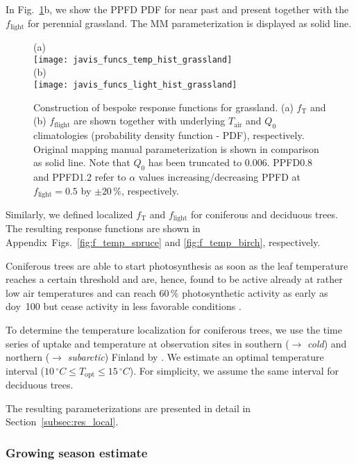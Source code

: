 \documentclass[bg, manuscript]{copernicus}
\begin{document}
In Fig.~\ref{fig:f_temp_grassland}b, we show the PPFD PDF for near past and present together with the $f_\mathrm{light}$ for perennial grassland. The MM parameterization is displayed as solid line.

\begin{figure}[t]
  \centering
  (a)\\
  \texttt{[image: javis\_funcs\_temp\_hist\_grassland]}\\
  (b)\\
  \texttt{[image: javis\_funcs\_light\_hist\_grassland]}
\caption{Construction of bespoke response functions for grassland. (a) $f_\mathrm{T}$ and (b) $f_\mathrm{flight}$ are shown together with underlying $T_\mathrm{air}$ and $Q_0$ climatologies (probability density function - PDF), respectively. Original mapping manual parameterization is shown in comparison as solid line. Note that $Q_0$ has been truncated to $0.006$. PPFD0.8 and PPFD1.2 refer to $\alpha$ values increasing/decreasing PPFD at $f_\mathrm{light}=0.5$ by $\pm 20\,\%$, respectively.}
\label{fig:f_temp_grassland}
\end{figure}

Similarly, we defined localized $f_\mathrm{T}$ and $f_\mathrm{light}$ for coniferous and deciduous trees. The resulting response functions are shown in Appendix~Figs.~\ref{fig:f_temp_spruce} and \ref{fig:f_temp_birch}, respectively.

Coniferous trees are able to start photosynthesis as soon as the leaf temperature reaches a certain threshold \citep{TB:Kolari2007} and are, hence, found to be active already at rather low air temperatures and can reach $60\,\unit{\%}$ photosynthetic activity as early as \unit{doy}~100 but cease activity in less favorable conditions \citep{TB:Kolari2007, TP:Wallin2013}. 

To determine the temperature localization for coniferous trees, we use the time series of  uptake and temperature at observation sites in southern ($\rightarrow$ \emph{cold}) and northern ($\rightarrow$ \emph{subarctic}) Finland by \citet{TB:Kolari2007}. We estimate an optimal temperature interval ($10\,\unit{^\circ C}\le T_\mathrm{opt} \le 15\,\unit{^\circ C}$). For simplicity, we assume the same interval for deciduous trees. 

The resulting parameterizations are presented in detail in Section~\ref{subsec:res_local}.

\subsubsection{Growing season estimate}
\label{subsec:gs_est}
\end{document}
